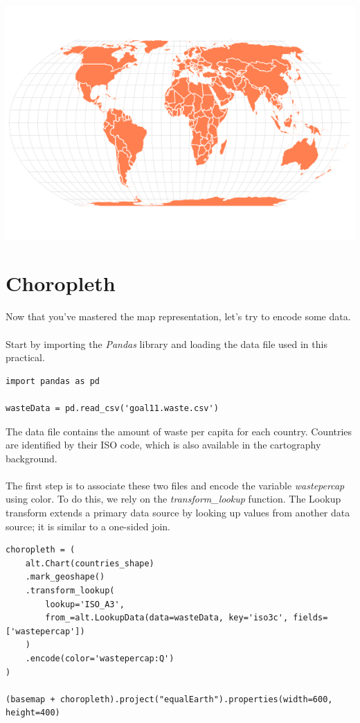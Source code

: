 \documentclass[11pt]{article}
\begin{document}
\begin{center}
\includegraphics[width=.6\textwidth]{visualization (4).png}
\end{center}

\section{Choropleth}

Now that you've mastered the map representation, let's try to encode some data.\\
\\
Start by importing the \textit{Pandas} library and loading the data file used in this practical.

\begin{verbatim}
import pandas as pd

wasteData = pd.read_csv('goal11.waste.csv')
\end{verbatim}

The data file contains the amount of waste per capita for each country. Countries are identified by their ISO code, which is also available in the cartography background.\\
\\
The first step is to associate these two files and encode the variable \textit{wastepercap} using color. To do this, we rely on the \textit{transform\_lookup} function. The Lookup transform extends a primary data source by looking up values from another data source; it is similar to a one-sided join.

\begin{verbatim}
choropleth = (
    alt.Chart(countries_shape)
    .mark_geoshape()
    .transform_lookup(
        lookup='ISO_A3',
        from_=alt.LookupData(data=wasteData, key='iso3c', fields=['wastepercap'])
    )
    .encode(color='wastepercap:Q')
)

(basemap + choropleth).project("equalEarth").properties(width=600, height=400)
\end{verbatim}
\end{document}

